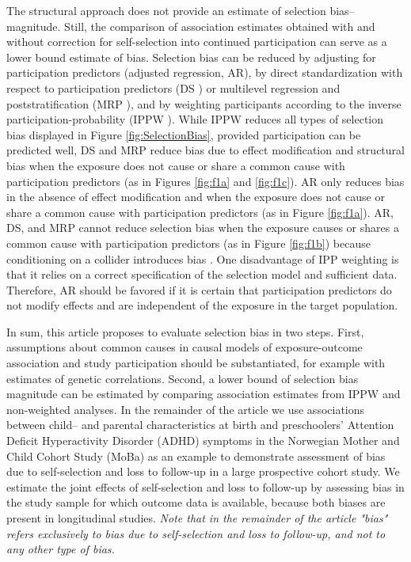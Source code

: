 \documentclass[12pt]{article}
\begin{document}
The structural approach does not provide an estimate of selection bias--magnitude. Still, the comparison of association estimates obtained with and without correction for self-selection into continued participation can serve as a lower bound estimate of bias. Selection bias can be reduced by adjusting for participation predictors (adjusted regression, AR), by direct standardization with respect to participation predictors (DS \cite{Miettinen1972-vf}) or multilevel regression and poststratification (MRP \cite{Downes2018-oa}), and by weighting participants according to the inverse participation-probability (IPPW \cite{Seaman2013-rj}). While IPPW reduces all types of selection bias displayed in Figure \ref{fig:SelectionBias}, provided participation can be predicted well, DS and MRP reduce bias due to effect modification and structural bias when the exposure does not cause or share a common cause with participation predictors (as in Figures \ref{fig:f1a} and \ref{fig:f1c}). AR only reduces bias in the absence of effect modification and when the exposure does not cause or share a common cause with participation predictors (as in Figure \ref{fig:f1a}). AR, DS, and MRP cannot reduce selection bias when the exposure causes or shares a common cause with participation predictors (as in Figure \ref{fig:f1b}) because conditioning on a collider introduces bias \cite{Cole2010-za}. One disadvantage of IPP weighting is that it relies on a correct specification of the selection model and sufficient data. Therefore, AR should be favored if it is certain that participation predictors do not modify effects and are independent of the exposure in the target population.

In sum, this article proposes to evaluate selection bias in two steps. First, assumptions about common causes in causal models of exposure-outcome association and study participation should be substantiated, for example with estimates of genetic correlations. Second, a lower bound of selection bias magnitude can be estimated by comparing association estimates from IPPW and non-weighted analyses. In the remainder of the article we use associations between child-- and parental characteristics at birth and preschoolers' Attention Deficit Hyperactivity Disorder (ADHD) symptoms in the Norwegian Mother and Child Cohort Study (MoBa) as an example to demonstrate assessment of bias due to self-selection and loss to follow-up in a large prospective cohort study. We estimate the joint effects of self-selection and loss to follow-up by assessing bias in the study sample for which outcome data is available, because both biases are present in longitudinal studies. \emph{Note that in the remainder of the article "bias" refers exclusively to bias due to self-selection and loss to follow-up, and not to any other type of bias.}
\end{document}
